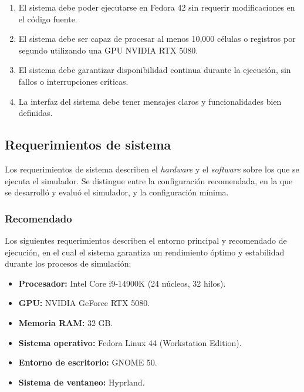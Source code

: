 \begin{enumerate}[label=RNF\arabic*., noitemsep, leftmargin=*]
	
	\item El sistema debe poder ejecutarse en Fedora 42 sin requerir modificaciones en el código fuente.
	
	\item El sistema debe ser capaz de procesar al menos 10,000 células o registros por segundo utilizando una GPU NVIDIA RTX 5080.
	
	\item El sistema debe garantizar disponibilidad continua durante la ejecución, sin fallos o interrupciones críticas.
	
	\item La interfaz del sistema debe tener mensajes claros y funcionalidades bien definidas.
	
\end{enumerate}

\subsection{Requerimientos de sistema}

Los requerimientos de sistema describen el \textit{hardware} y el \textit{software} sobre los que se ejecuta el simulador. Se distingue entre la configuración recomendada, en la que se desarrolló y evaluó el simulador, y la configuración mínima.

\subsubsection{Recomendado}

Los siguientes requerimientos describen el entorno principal y recomendado de ejecución, en el cual el sistema garantiza un rendimiento óptimo y estabilidad durante los procesos de simulación:

\begin{itemize}
	
	\item \textbf{Procesador:} Intel Core i9-14900K (24 núcleos, 32 hilos).
	
	\item \textbf{GPU:} NVIDIA GeForce RTX 5080.
	
	\item \textbf{Memoria RAM:} 32 GB.
	
	\item \textbf{Sistema operativo:} Fedora Linux 44 (Workstation Edition).
	
	\item \textbf{Entorno de escritorio:} GNOME 50.
	
	\item \textbf{Sistema de ventaneo:} Hyprland.
	
\end{itemize}


